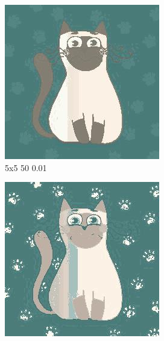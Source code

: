 \documentclass[12pt,a4paper]{article}
\begin{document}
\begin{figure}[htb]
\medskip
\begin{subfigure}{0.25\textwidth}
  \includegraphics[width=\linewidth]{images/cartoon/5-5-50-001}
  \caption{5x5 50 0.01}
  \label{fig:4}
\end{subfigure}\hfil %
\begin{subfigure}{0.25\textwidth}
  \includegraphics[width=\linewidth]{images/cartoon/5-5-255-05}

\end{subfigure}
\end{figure}
\end{document}
